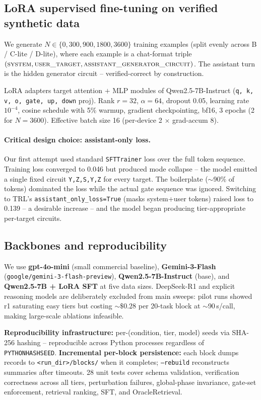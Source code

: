 \documentclass[11pt]{article}
\begin{document}
\subsection{LoRA supervised fine-tuning on verified synthetic data}

We generate $N \in \{0, 300, 900, 1800, 3600\}$ training examples (split evenly across B / C-lite / D-lite), where each example is a chat-format triple $(\textsc{system}, \textsc{user\_target}, \textsc{assistant\_generator\_circuit})$. The assistant turn is the hidden generator circuit -- verified-correct by construction.

LoRA adapters target attention $+$ MLP modules of Qwen2.5-7B-Instruct (\texttt{q, k, v, o, gate, up, down} proj). Rank $r=32$, $\alpha=64$, dropout 0.05, learning rate $10^{-4}$, cosine schedule with 5\% warmup, gradient checkpointing, bf16, 3 epochs (2 for $N=3600$). Effective batch size 16 (per-device 2 $\times$ grad-accum 8).

\paragraph{Critical design choice: assistant-only loss.} Our first attempt used standard \texttt{SFTTrainer} loss over the full token sequence. Training loss converged to 0.046 but produced mode collapse -- the model emitted a single fixed circuit \texttt{Y,Z,S,Y,Z} for every target. The boilerplate ($\sim$90\% of tokens) dominated the loss while the actual gate sequence was ignored. Switching to TRL's \texttt{assistant\_only\_loss=True} (masks system+user tokens) raised loss to 0.139 -- a desirable increase -- and the model began producing tier-appropriate per-target circuits.

\subsection{Backbones and reproducibility}

We use \textbf{gpt-4o-mini} (small commercial baseline), \textbf{Gemini-3-Flash} (\texttt{google/gemini-3-flash-preview}), \textbf{Qwen2.5-7B-Instruct} (base), and \textbf{Qwen2.5-7B + LoRA SFT} at five data sizes. DeepSeek-R1 and explicit reasoning models are deliberately excluded from main sweeps: pilot runs showed r1 saturating easy tiers but costing $\sim\$0.28$ per 20-task block at $\sim$90\,s/call, making large-scale ablations infeasible.

\textbf{Reproducibility infrastructure:} per-(condition, tier, model) seeds via SHA-256 hashing -- reproducible across Python processes regardless of \texttt{PYTHONHASHSEED}. \textbf{Incremental per-block persistence:} each block dumps records to \texttt{<run\_dir>/blocks/} when it completes; \texttt{--rebuild} reconstructs summaries after timeouts. 28 unit tests cover schema validation, verification correctness across all tiers, perturbation failures, global-phase invariance, gate-set enforcement, retrieval ranking, SFT, and OracleRetrieval.
\end{document}
